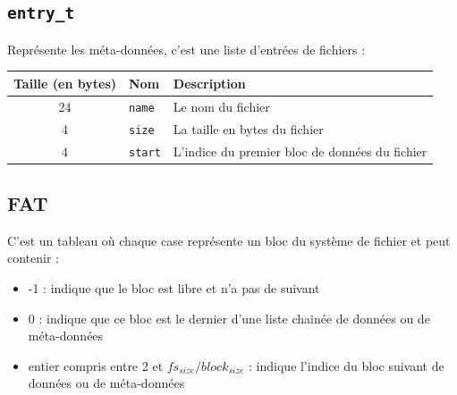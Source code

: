 \documentclass[a4paper, 12pt]{article}
\begin{document}
\subsection{\texttt{entry_t}} Représente les méta-données, c'est une liste d'entrées de fichiers :

\begin{tabular}{|c|l|p{.5\linewidth}|}	\hline
	\textbf{Taille (en bytes)}	& \textbf{Nom} & \textbf{Description} \\ \hline
	24	& \texttt{name} 	& Le nom du fichier \\ \hline
	4 	& \texttt{size} 	& La taille en bytes du fichier \\ \hline
	4 	& \texttt{start} & L'indice du premier bloc de données du fichier \\ \hline
\end{tabular}

\newpage
\subsection{FAT} C'est un tableau où chaque case représente un bloc du système de fichier et peut contenir :
\begin{itemize}
	\item -1 : indique que le bloc est libre et n'a pas de suivant
	\item 0 : indique que ce bloc est le dernier d'une liste chainée de données ou de méta-données
	\item entier compris entre 2 et $fs_{size} / block_{size}$ : indique l'indice du bloc suivant de données ou de méta-données
\end{itemize}
\end{document}

